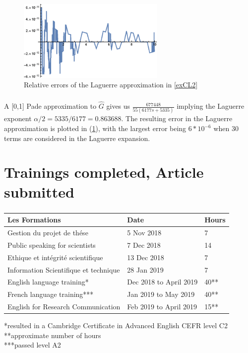 \documentclass[xcolor=pdftex,dvipsnames,table]{beamer}
\theoremstyle{definition}
\begin{document}
\begin{frame}
\frametitle{\insertsectionhead}
\framesubtitle{\insertsubsectionhead}
\begin{figure}
\caption{Relative errors of the Laguerre approximation in \ref{exCL2}}
\begin{center}
\includegraphics [width=2.8in]{err2.eps}
\end{center}
\label{err2}
\end{figure}
\end{frame}

\begin{frame}
\frametitle{\insertsectionhead}
\framesubtitle{\insertsubsectionhead}
A [0,1] Pade approximation to $\hat{G}$ gives us $\frac{677448}{55(6177s + 5335)}$ implying the Laguerre exponent $\alpha/2 = 5335/6177 = 0.863688$. The resulting error in the Laguerre approximation is plotted in (\ref{err2}), with the largest error being $6*10^{-6}$ when 30 terms are considered in the Laguerre expansion.
\end{frame}

\section{Trainings completed, Article submitted}
\begin{frame}
\frametitle{\insertsectionhead}
\begin{table}[]
\begin{tabular}{|l|l|l|}
\hline
\textbf{Les Formations}               & \textbf{Date}          & \textbf{Hours} \\ \hline
Gestion du projet de th\'ese            & 5 Nov 2018             & 7              \\ \hline
Public speaking for scientists        & 7 Dec 2018             & 14             \\ \hline
Ethique et int\'egrit\'e scientifique     & 13 Dec 2018            & 7              \\ \hline
Information Scientifique et technique & 28 Jan 2019            & 7              \\ \hline
English language training*             & Dec 2018 to April 2019 & 40**          \\ \hline
French language training***            & Jan 2019 to May 2019   & 40**            \\ \hline
English for Research Communication    & Feb 2019 to April 2019 & 15**          \\ \hline
\end{tabular}
\end{table}
*resulted in a Cambridge Certificate in Advanced English CEFR level C2\\
**approximate number of hours\\
***passed level A2
\end{frame}
\end{document}
